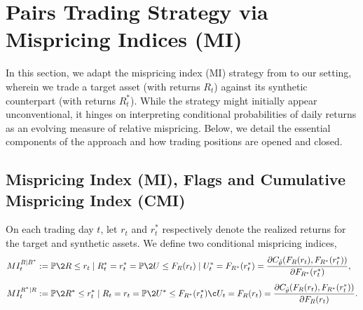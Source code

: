 \section{Pairs Trading Strategy via Mispricing Indices (MI)} \label{sec:trading_strategy}

In this section, we adapt the mispricing index (MI) strategy from \cite{Xie2016} to our setting, wherein we trade a target asset (with returns $R_t$) against its synthetic counterpart (with returns $R_t^*$). While the strategy might initially appear unconventional, it hinges on interpreting conditional probabilities of daily returns as an evolving measure of relative mispricing. Below, we detail the essential components of the approach and how trading positions are opened and closed.

\subsection{Mispricing Index (MI), Flags and Cumulative Mispricing Index (CMI)}

On each trading day $t$, let $r_t$ and $r_t^*$ respectively denote the realized returns for the target and synthetic assets. We define two conditional mispricing indices,
\begin{align*}
MI_t^{R \mid R^*} 
&:= 
\mathbb{P}\2{R \leq r_t \mid R_t^* = r_t^*}
=
\mathbb{P}\2{U \leq F_R(r_t) \mid U_t^* = F_{R^*}(r_t^*)}
= 
\frac{\partial C_{\hat{\theta}}(F_R(r_t), F_{R^*}(r_t^*))}{\partial F_{R^*}(r_t^*)}
,
\\[0.4em]
MI_t^{R^* \mid R} 
&:= \mathbb{P}\2{R^* \leq r_t^* \mid R_t = r_t}
=
\mathbb{P}\2{U^* \leq F_{R^*}(r_t^*) \c U_t = F_{R}(r_t)}
= 
\frac{\partial C_{\hat{\theta}}(F_R(r_t), F_{R^*}(r_t^*))}{\partial F_R(r_t)}
.
\end{align*}

